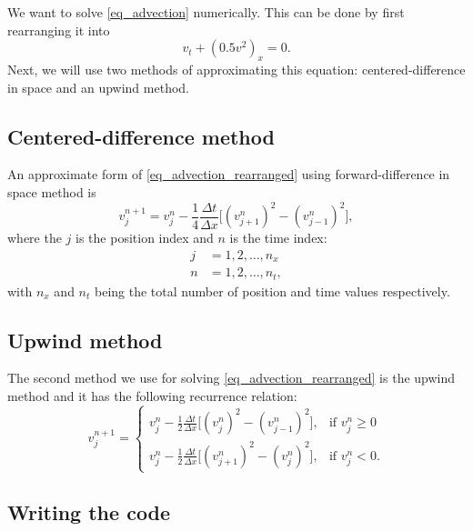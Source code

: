 We want to solve \autoref{eq_advection} numerically. This can be done by first rearranging it into
\begin{equation}
  v_t + (0.5 v^2)_x = 0.
  \label{eq_advection_rearranged}
\end{equation}
Next, we will use two methods of approximating this equation: centered-difference in space and an upwind method.


\subsection{Centered-difference method}

An approximate form of \autoref{eq_advection_rearranged} using forward-difference in space method is
\begin{equation}
  v_j^{n+1} = v_j^n - \frac{1}{4} \frac{\Delta t}{\Delta x} \big[ (v_{j+1}^n)^2 - (v_{j-1}^n)^2 \big],
  \label{eq_centered_difference_recurrence}
\end{equation}
where the $j$ is the position index and $n$ is the time index:
\begin{align*}
  j &= 1, 2, \dots, n_x \\
  n &= 1, 2, \dots, n_t,
\end{align*}
with $n_x$ and $n_t$ being the total number of position and time values respectively.


\subsection{Upwind method}

The second method we use for solving \autoref{eq_advection_rearranged} is the upwind method and it has the following recurrence relation:
\begin{equation}
  v_j^{n+1} =
    \begin{cases}
      v_j^n - \frac{1}{2} \frac{\Delta t}{\Delta x} \big[ (v_{j}^n)^2 - (v_{j-1}^n)^2 \big], & \mbox{if } v_{j}^n \geq 0 \\[10pt]
      v_j^n - \frac{1}{2} \frac{\Delta t}{\Delta x} \big[ (v_{j+1}^n)^2 - (v_{j}^n)^2 \big], & \mbox{if } v_{j}^n < 0.
    \end{cases}
    \label{eq_upwind_recurrence}
\end{equation}



\subsection{Writing the code}

